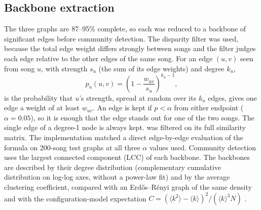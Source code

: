\subsection*{Backbone extraction}
The three graphs are 87--95\% complete, so each was reduced to a backbone of significant edges before community detection. The disparity filter \cite{TODO_serrano2009disparity} was used, because the total edge weight differs strongly between songs and the filter judges each edge relative to the other edges of the same song. For an edge $(u,v)$ seen from song $u$, with strength $s_u$ (the sum of its edge weights) and degree $k_u$,
\begin{equation}
  p_u(u,v) = \left(1 - \frac{w_{uv}}{s_u}\right)^{k_u-1},
\end{equation}
is the probability that $u$'s strength, spread at random over its $k_u$ edges, gives one edge a weight of at least $w_{uv}$. An edge is kept if $p < \alpha$ from either endpoint ($\alpha = 0.05$), so it is enough that the edge stands out for one of the two songs. The single edge of a degree-1 node is always kept. \Glyr{} was filtered on its full similarity matrix. The implementation matched a direct edge-by-edge evaluation of the formula on 200-song test graphs at all three $\alpha$ values used. Community detection uses the largest connected component (LCC) of each backbone. The backbones are described by their degree distribution (complementary cumulative distribution on log-log axes, without a power-law fit) and by the average clustering coefficient, compared with an Erd\H{o}s--R\'enyi graph \cite{TODO_erdos1959random} of the same density and with the configuration-model expectation $C = (\langle k^2\rangle - \langle k\rangle)^2 / (\langle k\rangle^3 N)$ \cite{TODO_newman2003structure}.

